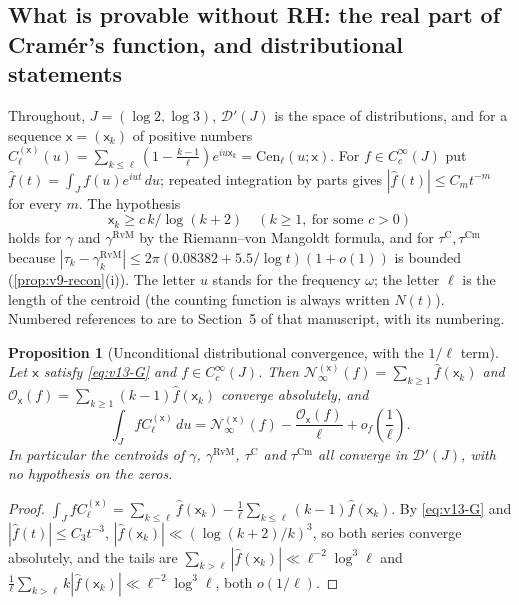\documentclass[11pt,a4paper]{article}
\numberwithin{equation}{section}
\newtheorem{proposition}[theorem]{Proposition}
\theoremstyle{definition}
\theoremstyle{remark}
\newcommand{\Cm}{\mathrm{Cm}}
\begin{document}
\subsection{What is provable without RH: the real part of Cram\'er's function, and distributional statements}\label{sec:v13-uncond}
Throughout, $J=(\log2,\log3)$, $\mathcal D'(J)$ is the space of distributions, and for a sequence $\mathsf x=(\mathsf x_k)$ of positive numbers $C^{(\mathsf x)}_\ell(u)=\sum_{k\le \ell}(1-\frac{k-1}{\ell})e^{iu\mathsf x_k}=\mathrm{Cen}_\ell(u;\mathsf x)$. For $f\in C_c^\infty(J)$ put $\hat f(t)=\int_Jf(u)e^{iut}\,du$; repeated integration by parts gives $|\hat f(t)|\le C_m t^{-m}$ for every $m$. The hypothesis
\begin{equation}
\mathsf x_k\ge c\,k/\log(k+2)\quad(k\ge1,\ \text{for some }c>0)\tag{Sp}\label{eq:v13-G}
\end{equation}
holds for $\gamma$ and $\gamma^{\mathrm{RvM}}$ by the Riemann--von Mangoldt formula, and for $\tau^{\mathrm C},\tau^{\Cm}$ because $|\tau_k-\gamma_k^{\mathrm{RvM}}|\le2\pi(0.08382+5.5/\log t)(1+o(1))$ is bounded (\cref{prop:v9-recon}(i)). The letter $u$ stands for the frequency $\omega$; the letter $\ell$ is the length of the centroid (the counting function is always written $N(t)$). Numbered references to \cite{CasanaV26} are to Section~5 of that manuscript, with its numbering.

\begin{proposition}[Unconditional distributional convergence, with the $1/\ell$ term]\label{prop:v13-dist}
Let $\mathsf x$ satisfy \eqref{eq:v13-G} and $f\in C_c^\infty(J)$. Then $\mathscr N_\infty^{(\mathsf x)}(f)=\sum_{k\ge1}\hat f(\mathsf x_k)$ and $\mathscr O_{\mathsf x}(f)=\sum_{k\ge1}(k-1)\hat f(\mathsf x_k)$ converge absolutely, and
\begin{equation}
\int_JfC_\ell^{(\mathsf x)}\,du=\mathscr N_\infty^{(\mathsf x)}(f)-\frac{\mathscr O_{\mathsf x}(f)}\ell+o_f\!\left(\frac1\ell\right).
\end{equation}
In particular the centroids of $\gamma$, $\gamma^{\mathrm{RvM}}$, $\tau^{\mathrm C}$ and $\tau^{\Cm}$ all converge in $\mathcal D'(J)$, with no hypothesis on the zeros.
\end{proposition}
\begin{proof}
$\int_JfC_\ell^{(\mathsf x)}=\sum_{k\le \ell}\hat f(\mathsf x_k)-\frac1\ell\sum_{k\le \ell}(k-1)\hat f(\mathsf x_k)$. By \eqref{eq:v13-G} and $|\hat f(t)|\le C_3t^{-3}$, $|\hat f(\mathsf x_k)|\ll(\log(k+2)/k)^3$, so both series converge absolutely, and the tails are $\sum_{k>\ell}|\hat f(\mathsf x_k)|\ll \ell^{-2}\log^3\ell$ and $\frac1\ell\sum_{k>\ell}k|\hat f(\mathsf x_k)|\ll \ell^{-2}\log^3\ell$, both $o(1/\ell)$.
\end{proof}
\end{document}
